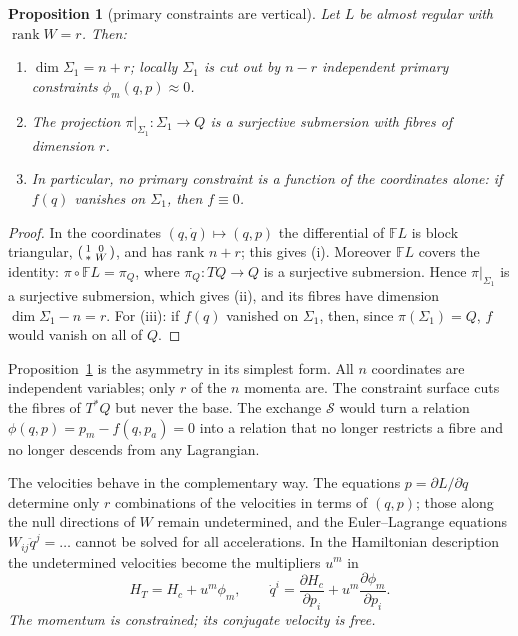 \documentclass[11pt,a4paper]{article}
\newtheorem{proposition}[theorem]{Proposition}
\theoremstyle{definition}
\theoremstyle{remark}
\newcommand{\weq}{\approx}
\newcommand{\FL}{\mathbb{F}\!L}
\newcommand{\Sw}{\mathcal{S}}
\DeclareMathOperator{\rank}{rank}
\begin{document}
\begin{proposition}[primary constraints are vertical]\label{prop:vertical}
Let $L$ be almost regular with $\rank W=r$. Then:
\begin{enumerate}
\item[(i)] $\dim\Sigma_1=n+r$; locally $\Sigma_1$ is cut out by $n-r$ independent primary constraints $\phi_m(q,p)\weq0$.
\item[(ii)] The projection $\pi|_{\Sigma_1}:\Sigma_1\to Q$ is a surjective submersion with fibres of dimension $r$.
\item[(iii)] In particular, no primary constraint is a function of the coordinates alone: if $f(q)$ vanishes on $\Sigma_1$, then $f\equiv0$.
\end{enumerate}
\end{proposition}

\begin{proof}
In the coordinates $(q,\dot q)\mapsto(q,p)$ the differential of $\FL$ is block triangular,
$\begin{psmallmatrix}1&0\\ \ast&W\end{psmallmatrix}$, and has rank $n+r$; this gives (i). Moreover $\FL$ covers the identity: $\pi\circ\FL=\pi_Q$, where $\pi_Q:TQ\to Q$ is a surjective submersion. Hence $\pi|_{\Sigma_1}$ is a surjective submersion, which gives (ii), and its fibres have dimension $\dim\Sigma_1-n=r$. For (iii): if $f(q)$ vanished on $\Sigma_1$, then, since $\pi(\Sigma_1)=Q$, $f$ would vanish on all of $Q$.
\end{proof}

Proposition~\ref{prop:vertical} is the asymmetry in its simplest form. All $n$ coordinates are independent variables; only $r$ of the $n$ momenta are. The constraint surface cuts the fibres of $T^*Q$ but never the base. The exchange $\Sw$ would turn a relation $\phi(q,p)=p_m-f(q,p_a)=0$ into a relation that no longer restricts a fibre and no longer descends from any Lagrangian.

The velocities behave in the complementary way. The equations $p=\partial L/\partial\dot q$ determine only $r$ combinations of the velocities in terms of $(q,p)$; those along the null directions of $W$ remain undetermined, and the Euler--Lagrange equations $W_{ij}\ddot q^j=\dots$ cannot be solved for all accelerations. In the Hamiltonian description the undetermined velocities become the multipliers $u^m$ in
\begin{equation}\label{eq:HT}
H_T=H_c+u^m\phi_m,\qquad \dot q^i=\frac{\partial H_c}{\partial p_i}+u^m\frac{\partial\phi_m}{\partial p_i}.
\end{equation}
\emph{The momentum is constrained; its conjugate velocity is free.}
\end{document}

